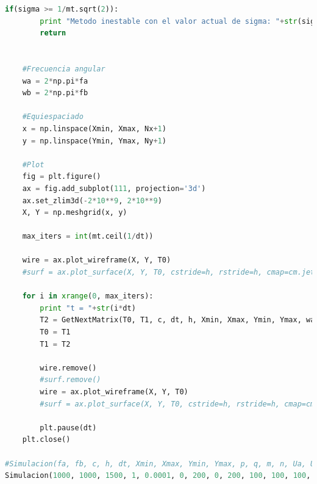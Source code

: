 \documentclass[letterpaper]{article}
\newcommand{\5}
{
\\[.5cm]
}
\begin{document}
\begin{lstlisting}[language=Python]
	if(sigma >= 1/mt.sqrt(2)):
		print "Metodo inestable con el valor actual de sigma: "+str(sigma)
		return
	

	#Frecuencia angular
	wa = 2*np.pi*fa
	wb = 2*np.pi*fb

	#Equiespaciado
	x = np.linspace(Xmin, Xmax, Nx+1)
	y = np.linspace(Ymin, Ymax, Ny+1)

	#Plot
	fig = plt.figure()
	ax = fig.add_subplot(111, projection='3d')
	ax.set_zlim3d(-2*10**9, 2*10**9)
	X, Y = np.meshgrid(x, y)

	max_iters = int(mt.ceil(1/dt))

	wire = ax.plot_wireframe(X, Y, T0)
	#surf = ax.plot_surface(X, Y, T0, cstride=h, rstride=h, cmap=cm.jet)

	for i in xrange(0, max_iters):
		print "t = "+str(i*dt)
		T2 = GetNextMatrix(T0, T1, c, dt, h, Xmin, Xmax, Ymin, Ymax, wa, wb, p, q, m, n, i, Ua, Ub)
		T0 = T1
		T1 = T2

		wire.remove()
		#surf.remove()
		wire = ax.plot_wireframe(X, Y, T0)
		#surf = ax.plot_surface(X, Y, T0, cstride=h, rstride=h, cmap=cm.jet)
	
		plt.pause(dt)
	plt.close()

#Simulacion(fa, fb, c, h, dt, Xmin, Xmax, Ymin, Ymax, p, q, m, n, Ua, Ub):
Simulacion(1000, 1000, 1500, 1, 0.0001, 0, 200, 0, 200, 100, 100, 100, 50, 50, 50)
\end{lstlisting}
\end{document}
